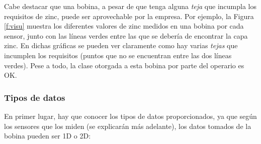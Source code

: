 Cabe destacar que una bobina, a pesar de que tenga alguna \emph{teja} que incumpla los requisitos de zinc, puede ser aprovechable por la empresa. Por ejemplo, la Figura \ref{f:visu} muestra los diferentes valores de zinc medidos en una bobina por cada sensor, junto con las líneas verdes entre las que se debería de encontrar la capa zinc. En dichas gráficas se pueden ver claramente como hay varias \emph{tejas} que incumplen los requisitos (puntos que no se encuentran entre las dos líneas verdes). Pese a todo, la clase otorgada a esta bobina por parte del operario es OK.

\subsubsection{Tipos de datos}
En primer lugar, hay que conocer los tipos de datos proporcionados, ya que según los sensores que los miden (se explicarán más adelante), los datos tomados de la bobina pueden ser 1D o 2D:
